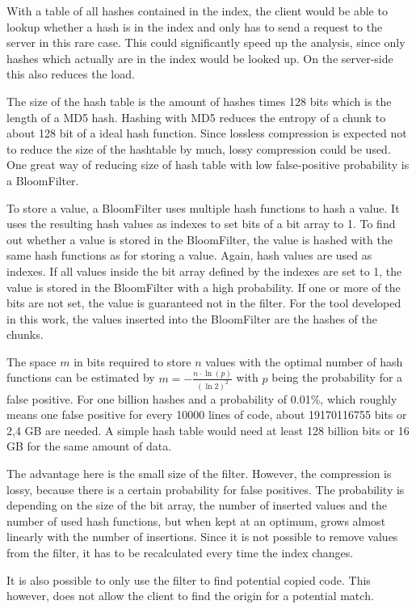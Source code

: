 With a table of all hashes contained in the index, the client would be able to lookup whether a hash is in the index and only has to send a request to the server in this rare case.
This could significantly speed up the analysis, since only hashes which actually are in the index would be looked up.
On the server-side this also reduces the load.

The size of the hash table is the amount of hashes times 128 bits which is the length of a MD5 hash.
Hashing with MD5 reduces the entropy of a chunk to about 128 bit of a ideal hash function.
Since lossless compression is expected not to reduce the size of the hashtable by much, lossy compression could be used.
One great way of reducing size of hash table with low false-positive probability is a BloomFilter.

To store a value, a BloomFilter uses multiple hash functions to hash a value. %
It uses the resulting hash values as indexes to set bits of a bit array to 1.
To find out whether a value is stored in the BloomFilter, the value is hashed with the same hash functions as for storing a value.
Again, hash values are used as indexes.
If all values inside the bit array defined by the indexes are set to 1, the value is stored in the BloomFilter with a high probability.
If one or more of the bits are not set, the value is guaranteed not in the filter.
For the tool developed in this work, the values inserted into the BloomFilter are the hashes of the chunks.

The space $m$ in bits required to store $n$ values with the optimal number of hash functions can be estimated by $m = -\frac{n\cdot \ln(p)}{(\ln2)^{2}}$ with $p$ being the probability for a false positive.
For one billion hashes and a probability of 0.01\%, which roughly means one false positive for every 10000 lines of code, about 19170116755 bits or 2,4 GB are needed.
A simple hash table would need at least 128 billion bits or 16 GB for the same amount of data.

The advantage here is the small size of the filter.
However, the compression is lossy, because there is a certain probability for false positives.
The probability is depending on the size of the bit array, the number of inserted values and the number of used hash functions, but when kept at an optimum, grows almost linearly with the number of insertions.
Since it is not possible to remove values from the filter, it has to be recalculated every time the index changes.

It is also possible to only use the filter to find potential copied code.
This however, does not allow the client to find the origin for a potential match.
	
